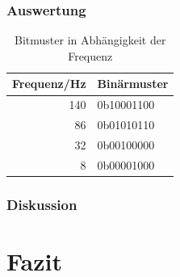 \documentclass[12pt,a4paper]{article}
\begin{document}
\subsubsection*{Auswertung}

\begin{table}[htbp]
\begin{center}
\begin{tabular}{|r|l|}
\hline
\multicolumn{1}{|l|}{Frequenz/Hz} & Binärmuster \\ \hline \hline
140 & 0b10001100 \\ \hline
86 & 0b01010110 \\ \hline
32 & 0b00100000 \\ \hline
8 & 0b00001000 \\ \hline
\end{tabular}
\end{center}
\caption{Bitmuster in Abhängigkeit der Frequenz}
\label{tab:frequ}
\end{table}




\subsubsection*{Diskussion}


\section{Fazit}
\end{document}
